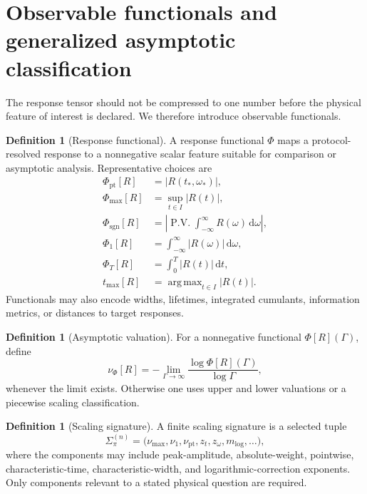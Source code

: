 \documentclass[11pt]{article}
\theoremstyle{definition}
\newtheorem{definition}[theorem]{Definition}
\theoremstyle{remark}
\DeclareMathOperator*{\argmax}{arg\,max}
\newcommand{\dd}{\,\mathrm d}
\newcommand{\PhiF}{\Phi}
\newcommand{\PV}{\operatorname{P.V.}}
\begin{document}
\section{Observable functionals and generalized asymptotic classification}

The response tensor should not be compressed to one number before the physical feature of interest is declared. We therefore introduce observable functionals.

\begin{definition}[Response functional]\label{def:functional}
A response functional $\PhiF$ maps a protocol-resolved response to a nonnegative scalar feature suitable for comparison or asymptotic analysis. Representative choices are
\begin{align}
\PhiF_{\mathrm{pt}}[R]
 &= |R(t_*,\omega_*)|,
\\
\PhiF_{\max}[R]
 &= \sup_{t\in I}|R(t)|,
\\
\PhiF_{\mathrm{sgn}}[R]
 &= \left|\PV\int_{-\infty}^{\infty}R(\omega)\dd\omega\right|,
\\
\PhiF_{1}[R]
 &= \int_{-\infty}^{\infty}|R(\omega)|\dd\omega,
\\
\PhiF_{T}[R]
 &= \int_{0}^{T}|R(t)|\dd t,
\\
t_{\max}[R]
 &= \argmax_{t\in I}|R(t)|.
\end{align}
Functionals may also encode widths, lifetimes, integrated cumulants, information metrics, or distances to target responses.
\end{definition}

\begin{definition}[Asymptotic valuation]\label{def:valuation}
For a nonnegative functional $\PhiF[R](\Gamma)$, define
\begin{equation}
\boxed{
\nu_{\PhiF}[R]
 = -\lim_{\Gamma\to\infty}
 \frac{\log\PhiF[R](\Gamma)}{\log\Gamma},
}
\label{eq:valuation}
\end{equation}
whenever the limit exists. Otherwise one uses upper and lower valuations or a piecewise scaling classification.
\end{definition}

\begin{definition}[Scaling signature]\label{def:signature}
A finite scaling signature is a selected tuple
\begin{equation}
\boxed{
\Sigma_{\pi}^{(n)}
 = \bigl(
 \nu_{\max},\nu_{1},\nu_{\mathrm{pt}},z_t,z_{\omega},m_{\log},\ldots
 \bigr),
}
\label{eq:signature}
\end{equation}
where the components may include peak-amplitude, absolute-weight, pointwise, characteristic-time, characteristic-width, and logarithmic-correction exponents. Only components relevant to a stated physical question are required.
\end{definition}
\end{document}
